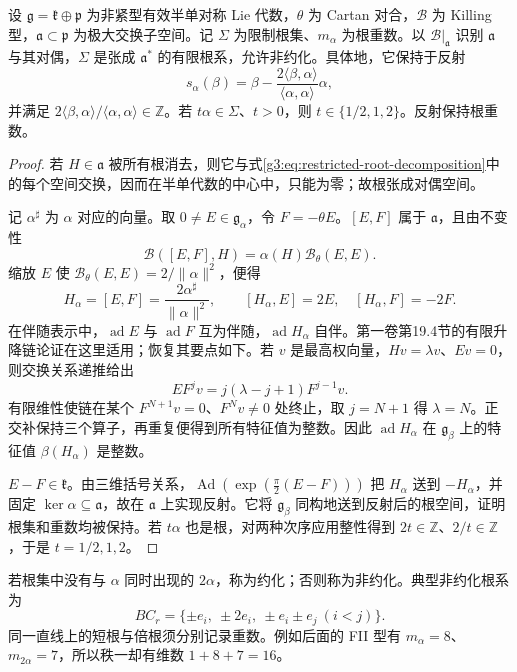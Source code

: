 \begin{proposition}\label{g3:prop:restricted-root-system}
	设 \(\mathfrak g=\mathfrak k\oplus\mathfrak p\) 为非紧型有效半单对称 Lie 代数，\(\theta\) 为 Cartan 对合，\(\mathcal B\) 为 Killing 型，\(\mathfrak a\subset\mathfrak p\) 为极大交换子空间。记 \(\Sigma\) 为限制根集、\(m_\alpha\) 为根重数。以 \(\mathcal B|_{\mathfrak a}\) 识别 \(\mathfrak a\) 与其对偶，\(\Sigma\) 是张成 \(\mathfrak a^*\) 的有限根系，允许非约化。具体地，它保持于反射
	\[
		s_\alpha(\beta)=\beta-
		\frac{2\langle\beta,\alpha\rangle}{\langle\alpha,\alpha\rangle}\alpha,
	\]
	并满足 \(2\langle\beta,\alpha\rangle/\langle\alpha,\alpha\rangle\in\mathbb Z\)。若 \(t\alpha\in\Sigma\)、\(t>0\)，则 \(t\in\{1/2,1,2\}\)。反射保持根重数。
\end{proposition}
\begin{proof}
	若 \(H\in\mathfrak a\) 被所有根消去，则它与式\eqref{g3:eq:restricted-root-decomposition}中的每个空间交换，因而在半单代数的中心中，只能为零；故根张成对偶空间。

	记 \(\alpha^\sharp\) 为 \(\alpha\) 对应的向量。取 \(0\ne E\in\mathfrak g_\alpha\)，令 \(F=-\theta E\)。\([E,F]\) 属于 \(\mathfrak a\)，且由不变性
	\[
		\mathcal B([E,F],H)=\alpha(H)\mathcal B_\theta(E,E).
	\]
	缩放 \(E\) 使 \(\mathcal B_\theta(E,E)=2/\lVert\alpha\rVert^2\)，便得
	\[
		H_\alpha=[E,F]=\frac{2\alpha^\sharp}{\lVert\alpha\rVert^2},\qquad
		[H_\alpha,E]=2E,\quad[H_\alpha,F]=-2F.
	\]
	在伴随表示中，\(\operatorname{ad}E\) 与 \(\operatorname{ad}F\) 互为伴随，\(\operatorname{ad}H_\alpha\) 自伴。第一卷第19.4节的有限升降链论证在这里适用；恢复其要点如下。若 \(v\) 是最高权向量，\(Hv=\lambda v\)、\(Ev=0\)，则交换关系递推给出
	\[
		E F^jv=j(\lambda-j+1)F^{j-1}v.
	\]
	有限维性使链在某个 \(F^{N+1}v=0\)、\(F^Nv\ne0\) 处终止，取 \(j=N+1\) 得 \(\lambda=N\)。正交补保持三个算子，再重复便得到所有特征值为整数。因此 \(\operatorname{ad}H_\alpha\) 在 \(\mathfrak g_\beta\) 上的特征值 \(\beta(H_\alpha)\) 是整数。

	\(E-F\in\mathfrak k\)。由三维括号关系，\(\operatorname{Ad}(\exp(\tfrac\pi2(E-F)))\) 把 \(H_\alpha\) 送到 \(-H_\alpha\)，并固定 \(\ker\alpha\subseteq\mathfrak a\)，故在 \(\mathfrak a\) 上实现反射。它将 \(\mathfrak g_\beta\) 同构地送到反射后的根空间，证明根集和重数均被保持。若 \(t\alpha\) 也是根，对两种次序应用整性得到 \(2t\in\mathbb Z\)、\(2/t\in\mathbb Z\)，于是 \(t=1/2,1,2\)。
\end{proof}

若根集中没有与 \(\alpha\) 同时出现的 \(2\alpha\)，称为约化；否则称为非约化。典型非约化根系为
\[
	BC_r=\{\pm e_i,\ \pm2e_i,\ \pm e_i\pm e_j\ (i<j)\}.
\]
同一直线上的短根与倍根须分别记录重数。例如后面的 FII 型有 \(m_\alpha=8\)、\(m_{2\alpha}=7\)，所以秩一却有维数 \(1+8+7=16\)。

